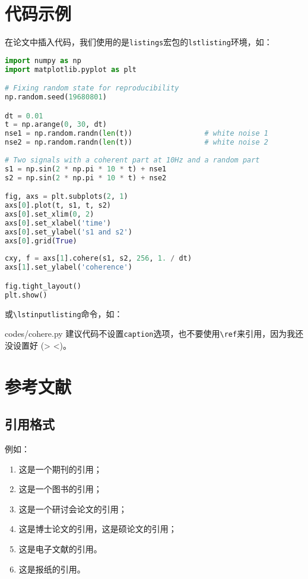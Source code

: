 \section{代码示例}

在论文中插入代码，我们使用的是\texttt{listings}宏包的\texttt{lstlisting}环境，如：
\begin{lstlisting}[language=Python,
    caption1=Python 画图代码1,
    caption2=Python ploting code 1]
import numpy as np
import matplotlib.pyplot as plt

# Fixing random state for reproducibility
np.random.seed(19680801)

dt = 0.01
t = np.arange(0, 30, dt)
nse1 = np.random.randn(len(t))                 # white noise 1
nse2 = np.random.randn(len(t))                 # white noise 2
    
# Two signals with a coherent part at 10Hz and a random part
s1 = np.sin(2 * np.pi * 10 * t) + nse1
s2 = np.sin(2 * np.pi * 10 * t) + nse2

fig, axs = plt.subplots(2, 1)
axs[0].plot(t, s1, t, s2)
axs[0].set_xlim(0, 2)
axs[0].set_xlabel('time')
axs[0].set_ylabel('s1 and s2')
axs[0].grid(True)
 
cxy, f = axs[1].cohere(s1, s2, 256, 1. / dt)
axs[1].set_ylabel('coherence')

fig.tight_layout()
plt.show()
\end{lstlisting}
或\texttt{\textbackslash lstinputlisting}命令，如：

{codes/cohere.py}
建议代码不设置\texttt{caption}选项，也不要使用\texttt{\textbackslash ref}来引用，因为我还没设置好 (> <)。

\section{参考文献}\label{sec:bibstyle}

\subsection{引用格式}

例如：
\begin{enumerate}
    \item 这是一个期刊的引用\cite{LIGOScientific:2017zic}；
    \item 这是一个图书的引用\cite{Rubakov:2017xzr,Zhang:2021}；
    \item 这是一个研讨会论文的引用\cite{Tanikawa:2021+x}；
    \item 这是博士论文的引用\cite{Migenda:2019xbm,HuangGuoYuan:2020}，这是硕论文的引用\cite{Shojaeifar:2015csv,SongRen:2020}；
    \item 这是电子文献的引用\cite{Piro:2021oaa,bilibili:read}。
    \item 这是报纸的引用\cite{Li:2005}。
\end{enumerate}

